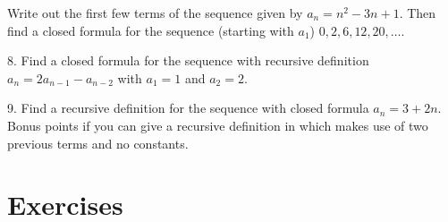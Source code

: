 \documentclass[10pt,]{book}
\theoremstyle{plain}
\theoremstyle{definition}
\numberwithin{equation}{chapter}
\begin{document}
\begin{exerciselist}
          Write out the first few terms of the sequence given by \(a_n = n^2 - 3n + 1\). Then find a closed formula for the sequence (starting with \(a_1\)) \(0, 2, 6, 12, 20, \ldots\).
\par\smallskip
\item[8.]\hypertarget{exercise-147}{}
          Find a closed formula for the sequence with recursive definition \(a_n = 2a_{n-1} - a_{n-2}\) with \(a_1 = 1\) and \(a_2 = 2\).
\par\smallskip
\item[9.]\hypertarget{exercise-148}{}
          Find a recursive definition for the sequence with closed formula \(a_n = 3 + 2n\). Bonus points if you can give a recursive definition in which makes use of two previous terms and no constants.
\par\smallskip
\end{exerciselist}
\typeout{************************************************}
\typeout{************************************************}
\section[Exercises]{Exercises}\label{section-13}
\typeout{************************************************}
\typeout{************************************************}
\end{document}
